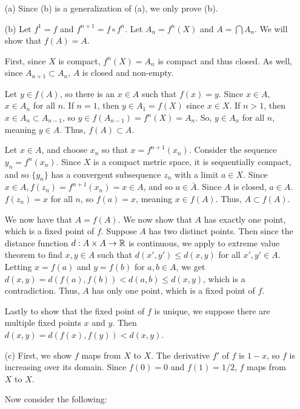 \documentclass{hmwk}
\begin{document}
\begin{solution}
\begin{itemize}
    \item[(a)] Since (b) is a generalization of (a), we only prove (b).
    \item[(b)] Let $f^1 = f$ and $f^{n+1} = f \circ f^n$. Let $A_n = f^n(X)$ and $A = \bigcap A_n$. We will show that $f(A) = A$.

    \pre First, since $X$ is compact, $f^n(X) = A_n$ is compact and thus closed. As well, since $A_{n+1} \subset A_n$, $A$ is closed and non-empty. 

    \pre Let $y \in f(A)$, so there is an $x \in A$ such that $f(x) = y$. Since $x \in A$, $x \in A_n$ for all $n$. If $n=1$, then $y \in A_1 = f(X)$ since $x \in X$. If $n > 1$, then $x \in A_n \subset A_{n-1}$, so $y \in f(A_{n-1}) = f^n(X) = A_n$. So, $y \in A_n$ for all $n$, meaning $y \in A$. Thus, $f(A) \subset A$. 

    \pre Let $x \in A$, and choose $x_n$ so that $x = f^{n+1}(x_n)$. Consider the sequence $y_n = f^n(x_n)$. Since $X$ is a compact metric space, it is sequentially compact, and so $\{y_n\}$ has a convergent subsequence $z_n$ with a limit $a \in X$. Since $x \in A, f(z_n) = f^{n+1}(x_n) = x \in A$, and so $a \in \bar{A}$. Since $A$ is closed, $a \in A$. $f(z_n) = x$ for all $n$, so $f(a) = x$, meaning $x \in f(A)$. Thus, $A \subset f(A).$

    \pre We now have that $A = f(A)$. We now show that $A$ has exactly one point, which is a fixed point of $f$. Suppose $A$ has two distinct points. Then since the distance function $d: A \times A \rightarrow \mathbb{R}$ is continuous, we apply to extreme value theorem to find $x, y \in A$ such that $d(x', y') \leq d(x, y)$ for all $x', y' \in A$. Letting $x = f(a)$ and $y = f(b)$ for $a, b \in A$, we get $d(x, y) = d(f(a), f(b)) < d(a, b) \leq d(x, y)$, which is a contradiction. Thus, $A$ has only one point, which is a fixed point of $f$.

    \pre Lastly to show that the fixed point of $f$ is unique, we suppose there are multiple fixed points $x$ and $y$. Then $d(x, y) = d(f(x), f(y)) < d(x, y)$.

    \item[(c)] First, we show $f$ maps from $X$ to $X$. The derivative $f'$ of $f$ is $1 - x$, so $f$ is increasing over its domain. Since $f(0) = 0$ and $f(1) = 1/2$, $f$ maps from $X$ to $X$. 

    \pre Now consider the following:
    

\end{itemize}
\end{solution}
\end{document}
